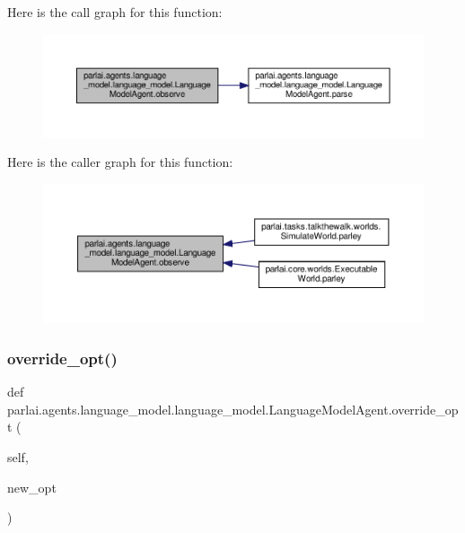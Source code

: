 Here is the call graph for this function\+:
\nopagebreak
\begin{figure}[H]
\begin{center}
\leavevmode
\includegraphics[width=350pt]{classparlai_1_1agents_1_1language__model_1_1language__model_1_1LanguageModelAgent_a78df1c525c94c4cc68e05cd44ee374fd_cgraph}
\end{center}
\end{figure}
Here is the caller graph for this function\+:
\nopagebreak
\begin{figure}[H]
\begin{center}
\leavevmode
\includegraphics[width=350pt]{classparlai_1_1agents_1_1language__model_1_1language__model_1_1LanguageModelAgent_a78df1c525c94c4cc68e05cd44ee374fd_icgraph}
\end{center}
\end{figure}
\mbox{\label{classparlai_1_1agents_1_1language__model_1_1language__model_1_1LanguageModelAgent_acd53015e95f8aead134d65e2cc8cf180}} 
\subsubsection{\texorpdfstring{override\+\_\+opt()}{override\_opt()}}
{\footnotesize\ttfamily def parlai.\+agents.\+language\+\_\+model.\+language\+\_\+model.\+Language\+Model\+Agent.\+override\+\_\+opt (\begin{DoxyParamCaption}\item[{}]{self,  }\item[{}]{new\+\_\+opt }\end{DoxyParamCaption})}

